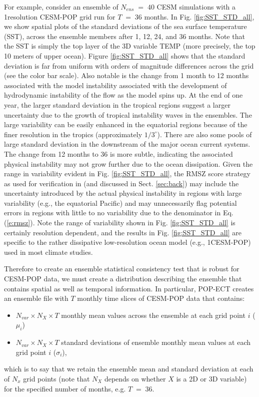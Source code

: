 \documentclass[gmd, manuscript]{copernicus}
\begin{document}
For example, consider an ensemble of $N_{ens} \;=\; 40$ CESM simulations with a 1\degree\space resolution CESM-POP grid run for $T\;=\;36$ months.  In Fig. \ref{fig:SST_STD_all}, we show spatial plots of the standard deviations of the sea surface temperature (SST), across the ensemble members after 1, 12, 24, and 36 months.  Note that the SST is simply the top layer of the 3D variable TEMP (more precisely, the top 10 meters of upper ocean).  Figure \ref{fig:SST_STD_all} shows that the standard deviation is far from uniform with orders of magnitude differences across the grid (see the color bar scale).  Also notable is the change from 1 month to 12 months associated with the model instability 
associated with the development of hydrodynamic instability of the flow as the model spins up.
At the end of one year, the larger standard deviation in the tropical regions suggest a larger uncertainty due to the growth of tropical instability waves \citep{legeckis1977} in the ensembles.  The large variability can be easily enhanced in the equatorial regions because of the finer resolution in the tropics (approximately $1/3^\circ$).  There are also some pools of large standard deviation in the downstream of the major ocean current systems.  The change from 12 months to 36 is more subtle, indicating the associated physical instability may not grow further due to the ocean dissipation.  Given the range in variability evident in Fig. \ref{fig:SST_STD_all}, the RMSZ score strategy as used for verification in \cite{yong2015} (and discussed in Sect. \ref{sec:back}) may include the uncertainty introduced by the actual physical instability in regions with large variability (e.g., the equatorial Pacific) and may unnecessarily flag potential errors in regions with little to no variability due to the denominator in Eq. (\ref{e:rmsz}). 
Note the range of variability shown in Fig. \ref{fig:SST_STD_all} is certainly resolution dependent, and the results in Fig. \ref{fig:SST_STD_all} are specific to the rather dissipative low-resolution ocean model (e.g., 1\degree\space CESM-POP) used in most climate studies.

Therefore to create an ensemble statistical consistency test that is robust for CESM-POP data, we must create a distribution describing the ensemble that contains spatial as well as temporal information. In particular, POP-ECT creates an ensemble file with $T$ monthly time slices of CESM-POP data that contains:  
\begin{itemize}
 \item $N_{var} \times N_X \times T$  monthly mean values across the ensemble at each grid point $i$ ($\mu_i$)
 \item $N_{var} \times N_X \times T$ standard deviations of ensemble monthly mean values at each grid point $i$ ($\sigma_i$),
 \end{itemize}
which is to say that we retain the ensemble mean and standard deviation at each of $N_x$ grid points (note that $N_X$ depends on whether $X$ is a 2D or 3D variable) for the specified number of months, e.g. $T \;=\; 36$.
\end{document}
